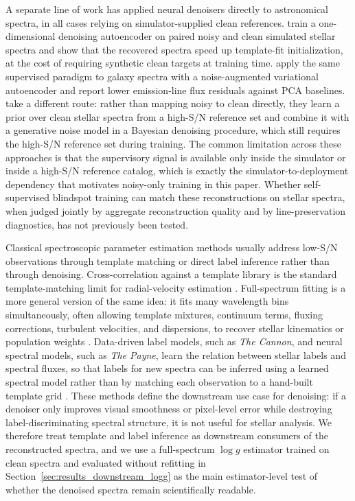 \documentclass[twocolumn]{aastex7}
\begin{document}
A separate line of work has applied neural denoisers directly to astronomical spectra, in all cases relying on simulator-supplied clean references. \citet{Pal2024_denoising_autoencoder} train a one-dimensional denoising autoencoder on paired noisy and clean simulated stellar spectra and show that the recovered spectra speed up template-fit initialization, at the cost of requiring synthetic clean targets at training time. \citet{Scourfield2023_AEgalaxies} apply the same supervised paradigm to galaxy spectra with a noise-augmented variational autoencoder and report lower emission-line flux residuals against PCA baselines. \citet{Kang2021_bayesian_spectrum_denoise} take a different route: rather than mapping noisy to clean directly, they learn a prior over clean stellar spectra from a high-S/N reference set and combine it with a generative noise model in a Bayesian denoising procedure, which still requires the high-S/N reference set during training. The common limitation across these approaches is that the supervisory signal is available only inside the simulator or inside a high-S/N reference catalog, which is exactly the simulator-to-deployment dependency that motivates noisy-only training in this paper. Whether self-supervised blindspot training can match these reconstructions on stellar spectra, when judged jointly by aggregate reconstruction quality and by line-preservation diagnostics, has not previously been tested.

Classical spectroscopic parameter estimation methods usually address low-S/N observations through template matching or direct label inference rather than through denoising. Cross-correlation against a template library is the standard template-matching limit for radial-velocity estimation \citep{Tonry1979_xcorr,Kurtz1998_RVSAO}. Full-spectrum fitting is a more general version of the same idea: it fits many wavelength bins simultaneously, often allowing template mixtures, continuum terms, fluxing corrections, turbulent velocities, and dispersions, to recover stellar kinematics or population weights \citep{Koleva2009_ULySS,Cappellari2017_pPXFUpdate}. Data-driven label models, such as \textit{The Cannon}, and neural spectral models, such as \textit{The Payne}, learn the relation between stellar labels and spectral fluxes, so that labels for new spectra can be inferred using a learned spectral model rather than by matching each observation to a hand-built template grid \citep{Ness2015_Cannon,Ting2019_Payne}. These methods define the downstream use case for denoising: if a denoiser only improves visual smoothness or pixel-level error while destroying label-discriminating spectral structure, it is not useful for stellar analysis. We therefore treat template and label inference as downstream consumers of the reconstructed spectra, and we use a full-spectrum $\log g$ estimator trained on clean spectra and evaluated without refitting in Section~\ref{sec:results_downstream_logg} as the main estimator-level test of whether the denoised spectra remain scientifically readable.
\end{document}
